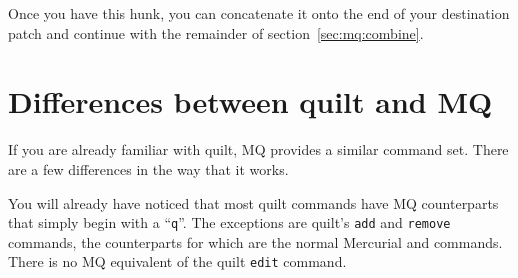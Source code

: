 Once you have this hunk, you can concatenate it onto the end of your
destination patch and continue with the remainder of
section~\ref{sec:mq:combine}.

\section{Differences between quilt and MQ}

If you are already familiar with quilt, MQ provides a similar command
set.  There are a few differences in the way that it works.

You will already have noticed that most quilt commands have MQ
counterparts that simply begin with a ``\texttt{q}''.  The exceptions
are quilt's \texttt{add} and \texttt{remove} commands, the
counterparts for which are the normal Mercurial  and
 commands.  There is no MQ equivalent of the quilt
\texttt{edit} command.

